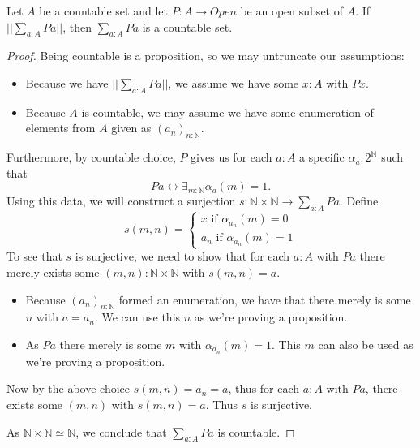 \begin{lemma}
  Let $A$ be a countable set and let $P:A \to Open$
  be an open subset of $A$. 
  If $||\sum_{a:A} P a||$, then $\sum_{a:A} P a$ is a countable set. 
\end{lemma}
\begin{proof}
  Being countable is a proposition, so we may untruncate our assumptions:
  \begin{itemize}
    \item 
      Because we have $||\sum_{a:A} P a||$, we assume we have  some $x:A$ with $P x$. 
    \item 
      Because $A$ is countable, we may assume we have some 
      enumeration of elements from $A$ given as $(a_n)_{n:\mathbb N}$.
  \end{itemize}
  Furthermore, by countable choice, $P$ gives us 
  for each $a:A$ a specific $\alpha_a:2^\mathbb N$ 
  such that 
  \begin{equation}
    P a \leftrightarrow \exists_{m:\mathbb N} \alpha_a(m) = 1.
  \end{equation}
  Using this data, we will 
  construct a surjection $s:\mathbb N \times \mathbb N \to \sum_{a:A} P a$. 
  Define 
  \begin{equation}
    s(m,n) = 
    \begin{cases}
      x \text{ if } \alpha_{a_n}(m) = 0 \\
      a_n \text{ if } \alpha_{a_n}(m) = 1
    \end{cases}
  \end{equation}
  To see that $s$ is surjective, we need to show that for each $a:A$ with $P a$ there 
  merely exists some $(m,n):\mathbb N \times \mathbb N$ 
  with $s(m,n) = a$. 
  \begin{itemize}
    \item 
  Because $(a_n)_{n:\mathbb N}$ formed an enumeration, we have that 
  there merely is some $n$ with $a = a_n$. 
  We can use this $n$ as we're proving a proposition. 
    \item 
  As $P a$ there merely is some $m$ with $\alpha_{a_n}(m) = 1$. 
  This $m$ can also be used as we're proving a proposition. 
  \end{itemize}
  Now by the above choice $s(m,n) = a_n = a$, 
  thus for each $a:A$ with $P a$, there exists some $(m,n)$ with 
  $s(m,n) = a$. Thus $s$ is surjective. 

  As $\mathbb N \times \mathbb N \simeq \mathbb N$, we conclude that 
  $\sum_{a:A} P a$ is countable. 
\end{proof}
